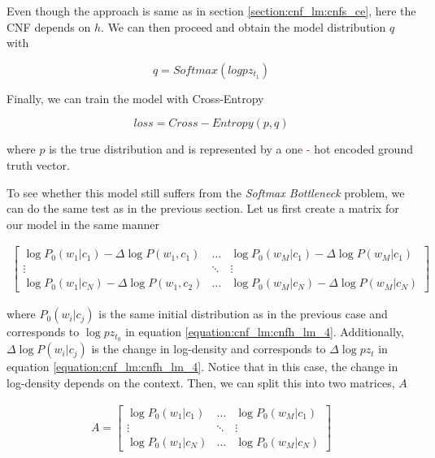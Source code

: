 Even though the approach is same as in section \ref{section:cnf_lm:cnfs_ce}, here the CNF depends on $ h $. We can then proceed and obtain the model distribution $ q $ with

\begin{displaymath}
    q = Softmax(log pz_{t_1})
\end{displaymath}

Finally, we can train the model with Cross-Entropy

\begin{displaymath}
    loss = Cross-Entropy(p, q)
\end{displaymath}

where $ p $ is the true distribution and is represented by a one \textcolor{red}{-} hot encoded ground truth vector.

To see whether this model still suffers from the \emph{Softmax Bottleneck} problem, we can do the same test as in the previous section. Let us first create a matrix for our model in the same manner

\begin{displaymath}
    \begin{matrix}
    \begin{bmatrix}
       \log P_0(w_1 | c_1) - \Delta \log P(w_1, c_1) & \hdots & \log P_0(w_M | c_1) - \Delta \log P(w_M | c_1)  \\
       \vdots & \ddots & \vdots \\
       \log P_0(w_1 | c_N) - \Delta \log P(w_1, c_2) & \hdots & \log P_0(w_M | c_N) - \Delta \log P(w_M | c_N)
      \end{bmatrix}
    \end{matrix}
\end{displaymath}

where $ P_0(w_i | c_j) $ is the same initial distribution as in the previous case and corresponds to $ \log pz_{t_0} $ in equation \ref{equation:cnf_lm:cnfh_lm_4}. Additionally, $ \Delta \log P(w_i | c_j) $ is the change in log-density and corresponds to $ \Delta \log pz_t $ in equation \ref{equation:cnf_lm:cnfh_lm_4}. Notice that in this case, the change in log-density depends on the context. Then, we can split this into two matrices, $ A $

\begin{displaymath}
    \begin{matrix}
    A = \begin{bmatrix}
       \log P_0(w_1 | c_1) & \hdots & \log P_0(w_M | c_1) \\
       \vdots & \ddots & \vdots \\
       \log P_0(w_1 | c_N) & \hdots & \log P_0(w_M | c_N)
      \end{bmatrix}
    \end{matrix}
\end{displaymath}

